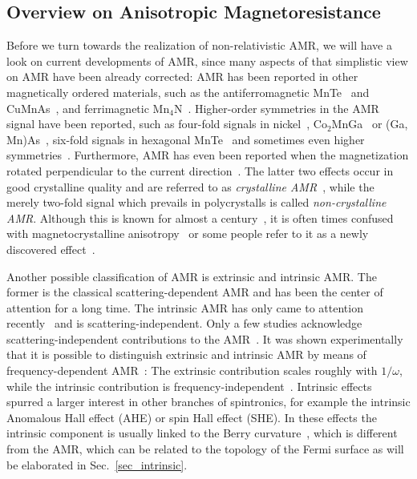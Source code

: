 \documentclass[prb,showpacs,amsmath,amssymb,superscriptaddress,twocolumn,floatfix]{revtex4-1}
\begin{document}
\subsection{Overview on Anisotropic Magnetoresistance}

Before we turn towards the realization of non-relativistic AMR, we will have a look on current developments of AMR, since many aspects of that simplistic view on AMR have been already corrected: AMR has been reported in other magnetically ordered materials, such as the antiferromagnetic MnTe~\cite{Gonzalez-Betancourt:2024, Kriegner:2017} and CuMnAs~\cite{Volny:2020, Zubac:2021, Wadley:2016}, and ferrimagnetic Mn$_4$N~\cite{Kabara:2017}. Higher-order symmetries in the AMR signal have been reported, such as four-fold signals in nickel~\cite{Doring:1938}, Co$_2$MnGa~\cite{Ritzinger:2021, Sato:2019} or (Ga, Mn)As~\cite{Limmer:2008, DeRanieri:2008}, six-fold signals in hexagonal MnTe~\cite{Gonzalez-Betancourt:2024, Kriegner:2017} and sometimes even higher symmetries~\cite{Gonzalez-Betancourt:2024, NamHai:2012}. Furthermore, AMR has even been reported when the magnetization rotated perpendicular to the current direction~\cite{Ritzinger:2021, Limmer:2008, Limmer:2006}. The latter two effects occur in good crystalline quality and are referred to as \textit{crystalline AMR}~\cite{Ritzinger:2021, DeRanieri:2008}, while the merely two-fold signal which prevails in polycrystalls is called \textit{non-crystalline AMR}. Although this is known for almost a century~\cite{Doring:1938}, it is often times confused with magnetocrystalline anisotropy~\cite{Ritzinger:2023} or some people refer to it as a newly discovered effect~\cite{Dong:2023}.

Another possible classification of AMR is extrinsic and intrinsic AMR. The former is the classical scattering-dependent AMR and has been the center of attention for a long time. The intrinsic AMR has only came to attention recently~\cite{Nadvordnik:2021, Park:2021} and is scattering-independent. Only a few studies acknowledge scattering-independent contributions to the AMR~\cite{Kato:2008, Velev:2005, Zeng:2020, Kato:2007}. It was shown experimentally that it is possible to distinguish extrinsic and intrinsic AMR by means of frequency-dependent AMR~\cite{Nadvordnik:2021, Park:2021}: The extrinsic contribution scales roughly with $1/\omega$, while the intrinsic contribution is frequency-independent~\cite{Nadvordnik:2021}. Intrinsic effects spurred a larger interest in other branches of spintronics, for example the intrinsic Anomalous Hall effect (AHE) or spin Hall effect (SHE). In these effects the intrinsic component is usually linked to the Berry curvature~\cite{Zhang:2017,Nagaosa:2010}, which is different from the AMR, which can be related to the topology of the Fermi surface as will be elaborated in Sec.~\ref{sec_intrinsic}.
\end{document}
